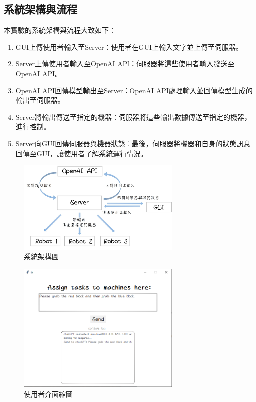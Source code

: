 \documentclass[class=NCU_thesis, crop=false]{standalone}
\begin{document}
\subsection{系統架構與流程}
本實驗的系統架構與流程大致如下：
\begin{enumerate}
    \item GUI上傳使用者輸入至Server：使用者在GUI上輸入文字並上傳至伺服器。
    \item Server上傳使用者輸入至OpenAI API：伺服器將這些使用者輸入發送至OpenAI API。
    \item OpenAI API回傳模型輸出至Server：OpenAI API處理輸入並回傳模型生成的輸出至伺服器。
    \item Server將輸出傳送至指定的機器：伺服器將這些輸出數據傳送至指定的機器，進行控制。
    \item Server向GUI回傳伺服器與機器狀態：最後，伺服器將機器和自身的狀態訊息回傳至GUI，讓使用者了解系統運行情況。
\end{enumerate}
\clearpage
\begin{figure}[h]
    \centering
    \includegraphics[width=0.7\textwidth]{figures/structure.jpg}
    \caption{系統架構圖}
\end{figure}

\begin{figure}[h]
    \centering
    \includegraphics[width=0.7\textwidth]{figures/GUI.png}
    \caption{使用者介面縮圖}
\end{figure}
\end{document}
